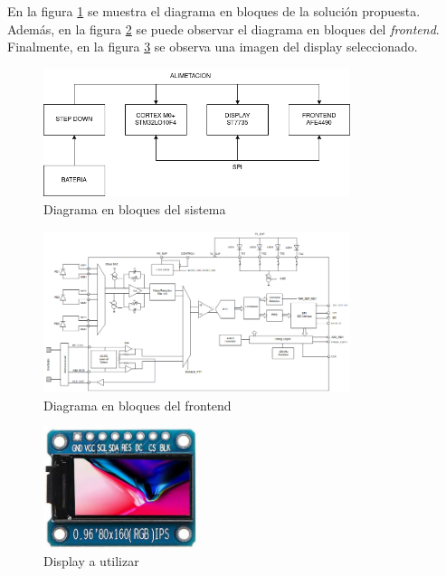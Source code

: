 \documentclass[
    11pt,
    spanish,
	a4paper
]{article}
\begin{document}
En la figura \ref{fig:bloques} se muestra el diagrama en bloques de la solución propuesta. 
Además, en la figura \ref{fig:frontend} se puede observar el diagrama en bloques del \emph{frontend}.
Finalmente, en la figura \ref{fig:display} se observa una imagen del display seleccionado.
\begin{figure}[h!]
    \centering
    \includegraphics[width=0.8\textwidth]{img/bloques.png}
    \caption{Diagrama en bloques del sistema}
    \label{fig:bloques}
\end{figure}

\begin{figure}[h!]
    \centering
    \includegraphics[width=0.8\textwidth]{img/frontend.png}
    \caption{Diagrama en bloques del frontend}
    \label{fig:frontend}
\end{figure}

\begin{figure}[h!]
    \centering
    \includegraphics[width=0.4\textwidth]{img/display.png}
    \caption{Display a utilizar}
    \label{fig:display}
\end{figure}
\end{document}

